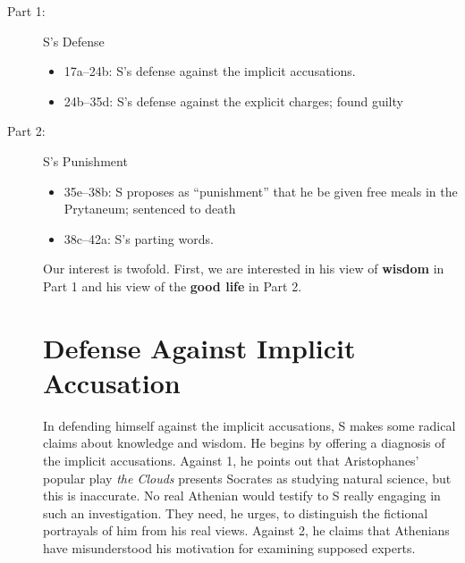 \documentclass[oneside]{article}
\begin{document}
\begin{description}
\item[Part 1:] S's Defense
\begin{itemize}
\item 17a--24b: S's defense against the implicit accusations. 
\item 24b--35d: S's defense against the explicit charges; found guilty
\end{itemize}
\item[Part 2:] S's Punishment
\begin{itemize}
\item  35e--38b: S proposes as ``punishment'' that he be given free meals in the Prytaneum; sentenced to death
\item 38c--42a: S's parting words.
\end{itemize}

Our interest is twofold. First, we are interested in his  view of \textbf{wisdom} in Part 1 and his view of the \textbf{good life} in Part 2. 


\section*{Defense Against Implicit Accusation}
In defending himself against the implicit  accusations, S makes some radical claims about knowledge and wisdom. He begins by  offering a diagnosis of the implicit accusations. Against 1, he points out that Aristophanes' popular play \emph{the Clouds} presents Socrates as studying natural science, but this is inaccurate. No real Athenian would testify to S really engaging in such an investigation. They need, he urges, to distinguish the fictional portrayals of him from his real views. Against 2, he claims that Athenians have misunderstood his motivation for examining supposed experts. 


\end{description}
\end{document}
